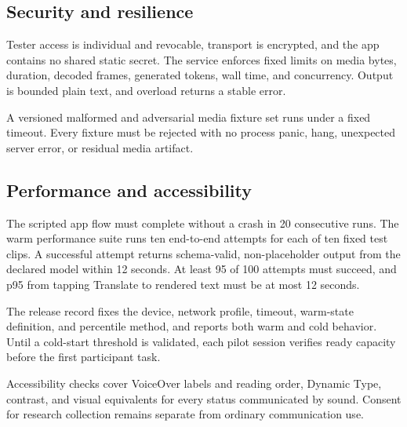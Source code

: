 \documentclass[11pt]{article}
\begin{document}
\subsection{Security and resilience}

Tester access is individual and revocable, transport is encrypted, and the app
contains no shared static secret. The service enforces fixed limits on media bytes,
duration, decoded frames, generated tokens, wall time, and concurrency. Output is
bounded plain text, and overload returns a stable error.

A versioned malformed and adversarial media fixture set runs under a fixed timeout.
Every fixture must be rejected with no process panic, hang, unexpected server error,
or residual media artifact.

\subsection{Performance and accessibility}

The scripted app flow must complete without a crash in 20 consecutive runs. The warm
performance suite runs ten end-to-end attempts for each of ten fixed test clips. A
successful attempt returns schema-valid, non-placeholder output from the declared
model within 12 seconds. At least 95 of 100 attempts must succeed, and p95 from tapping
Translate to rendered text must be at most 12 seconds.

The release record fixes the device, network profile, timeout, warm-state definition,
and percentile method, and reports both warm and cold behavior. Until a cold-start
threshold is validated, each pilot session verifies ready capacity before the first
participant task.

Accessibility checks cover VoiceOver labels and reading order, Dynamic Type, contrast,
and visual equivalents for every status communicated by sound. Consent for research
collection remains separate from ordinary communication use.
\end{document}
